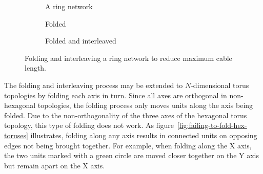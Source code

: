 		\begin{figure}
			\center
			\begin{subfigure}[b]{0.39\linewidth}
				\center
				\caption{A ring network}
				\label{fig:ring-folding-row}
			\end{subfigure}
			\begin{subfigure}[b]{0.24\linewidth}
				\center
				\caption{Folded}
				\label{fig:ring-folding-folded}
			\end{subfigure}
			\begin{subfigure}[b]{0.35\linewidth}
				\center
				\caption{Folded and interleaved}
				\label{fig:ring-folding-interleaved}
			\end{subfigure}
			
			\caption[Folding and interleaving a ring network]%
			{Folding and interleaving a ring network to reduce maximum cable
			length.}
			\label{fig:ring-folding}
		\end{figure}
		
		The folding and interleaving process may be extended to $N$-dimensional
		torus topologies by folding each axis in turn. Since all axes are
		orthogonal in non-hexagonal topologies, the folding process only moves
		units along the axis being folded. Due to the non-orthogonality of the
		three axes of the hexagonal torus topology, this type of folding does not
		work. As figure~\ref{fig:failing-to-fold-hex-toruses} illustrates, folding
		along any axis results in connected units on opposing edges not being
		brought together. For example, when folding along the X axis, the two units
		marked with a green circle are moved closer together on the Y axis but
		remain apart on the X axis.
		
